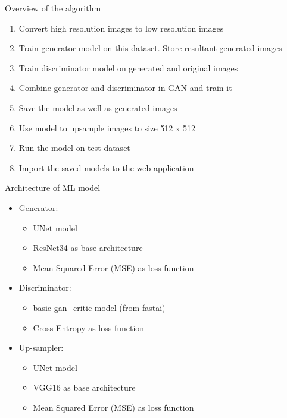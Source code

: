 \documentclass{beamer}
\begin{document}
	\begin{frame}{Overview of the algorithm}
		\begin{enumerate}
			\item Convert high resolution images to low resolution images
			\item Train generator model on this dataset. Store resultant generated images
			\item Train discriminator model on generated and original images
			\item Combine generator and discriminator in GAN and train it 
			\item Save the model as well as generated images
			\item Use model to upsample images to size 512 x 512
			\item Run the model on test dataset
			\item Import the saved models to the web application
		\end{enumerate}
	\end{frame}

	\begin{frame}{Architecture of ML model}
		\begin{itemize}
			\item Generator:
			\begin{itemize}
				\item UNet model
				\item ResNet34 as base architecture
				\item Mean Squared Error (MSE) as loss function
			\end{itemize}
			\item Discriminator:
			\begin{itemize}
				\item basic gan\_critic model (from fastai)
				\item Cross Entropy as loss function
			\end{itemize}
			\item Up-sampler:
			\begin{itemize}
				\item UNet model
				\item VGG16 as base architecture
				\item Mean Squared Error (MSE) as loss function
			\end{itemize}
		\end{itemize}
	\end{frame}
\end{document}
